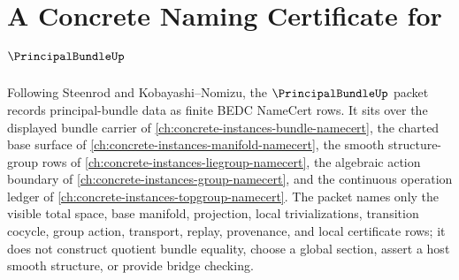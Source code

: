 \chapter{A Concrete Naming Certificate for $\PrincipalBundleUp$}
\label{ch:concrete-instances-principal-bundle-namecert}

Following Steenrod and Kobayashi--Nomizu, the $\PrincipalBundleUp$ packet records principal-bundle data as finite BEDC NameCert rows. It sits over the displayed bundle carrier of \autoref{ch:concrete-instances-bundle-namecert}, the charted base surface of \autoref{ch:concrete-instances-manifold-namecert}, the smooth structure-group rows of \autoref{ch:concrete-instances-liegroup-namecert}, the algebraic action boundary of \autoref{ch:concrete-instances-group-namecert}, and the continuous operation ledger of \autoref{ch:concrete-instances-topgroup-namecert}. The packet names only the visible total space, base manifold, projection, local trivializations, transition cocycle, group action, transport, replay, provenance, and local certificate rows; it does not construct quotient bundle equality, choose a global section, assert a host smooth structure, or provide bridge checking.

